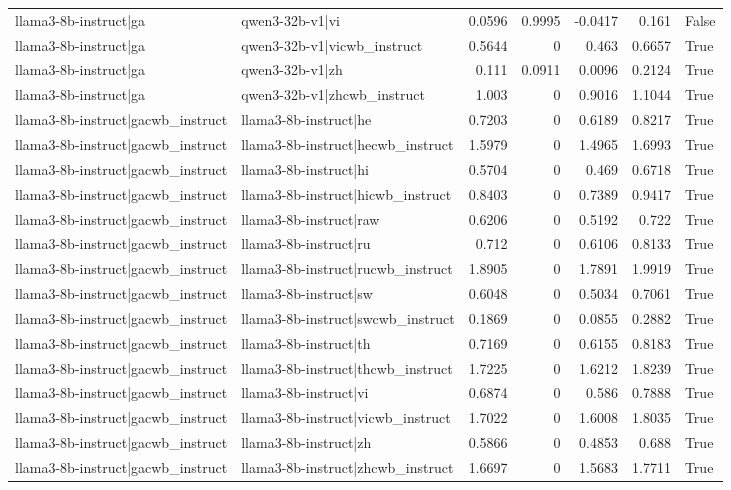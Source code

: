 \begin{table}
\begin{tabular}{l l r r r r l}
llama3-8b-instruct|ga & qwen3-32b-v1|vi & 0.0596 & 0.9995 & -0.0417 & 0.161 & False \\
llama3-8b-instruct|ga & qwen3-32b-v1|vicwb_instruct & 0.5644 & 0 & 0.463 & 0.6657 & True \\
llama3-8b-instruct|ga & qwen3-32b-v1|zh & 0.111 & 0.0911 & 0.0096 & 0.2124 & True \\
llama3-8b-instruct|ga & qwen3-32b-v1|zhcwb_instruct & 1.003 & 0 & 0.9016 & 1.1044 & True \\
llama3-8b-instruct|gacwb_instruct & llama3-8b-instruct|he & 0.7203 & 0 & 0.6189 & 0.8217 & True \\
llama3-8b-instruct|gacwb_instruct & llama3-8b-instruct|hecwb_instruct & 1.5979 & 0 & 1.4965 & 1.6993 & True \\
llama3-8b-instruct|gacwb_instruct & llama3-8b-instruct|hi & 0.5704 & 0 & 0.469 & 0.6718 & True \\
llama3-8b-instruct|gacwb_instruct & llama3-8b-instruct|hicwb_instruct & 0.8403 & 0 & 0.7389 & 0.9417 & True \\
llama3-8b-instruct|gacwb_instruct & llama3-8b-instruct|raw & 0.6206 & 0 & 0.5192 & 0.722 & True \\
llama3-8b-instruct|gacwb_instruct & llama3-8b-instruct|ru & 0.712 & 0 & 0.6106 & 0.8133 & True \\
llama3-8b-instruct|gacwb_instruct & llama3-8b-instruct|rucwb_instruct & 1.8905 & 0 & 1.7891 & 1.9919 & True \\
llama3-8b-instruct|gacwb_instruct & llama3-8b-instruct|sw & 0.6048 & 0 & 0.5034 & 0.7061 & True \\
llama3-8b-instruct|gacwb_instruct & llama3-8b-instruct|swcwb_instruct & 0.1869 & 0 & 0.0855 & 0.2882 & True \\
llama3-8b-instruct|gacwb_instruct & llama3-8b-instruct|th & 0.7169 & 0 & 0.6155 & 0.8183 & True \\
llama3-8b-instruct|gacwb_instruct & llama3-8b-instruct|thcwb_instruct & 1.7225 & 0 & 1.6212 & 1.8239 & True \\
llama3-8b-instruct|gacwb_instruct & llama3-8b-instruct|vi & 0.6874 & 0 & 0.586 & 0.7888 & True \\
llama3-8b-instruct|gacwb_instruct & llama3-8b-instruct|vicwb_instruct & 1.7022 & 0 & 1.6008 & 1.8035 & True \\
llama3-8b-instruct|gacwb_instruct & llama3-8b-instruct|zh & 0.5866 & 0 & 0.4853 & 0.688 & True \\
llama3-8b-instruct|gacwb_instruct & llama3-8b-instruct|zhcwb_instruct & 1.6697 & 0 & 1.5683 & 1.7711 & True \\

\end{tabular}
\end{table}

